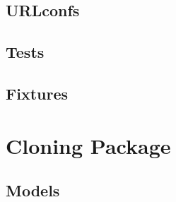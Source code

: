 \documentclass[letterpaper,10pt,english]{sphinxmanual}
\begin{document}
\subsection{URLconfs}
\label{api:id3}

\subsection{Tests}
\label{api:id4}

\subsection{Fixtures}
\label{api:id5}

\section{Cloning Package}
\label{api:module-experimentdb.cloning}\label{api:cloning-package}

\subsection{Models}
\label{api:id6}\label{api:module-experimentdb.cloning.models}
\end{document}
